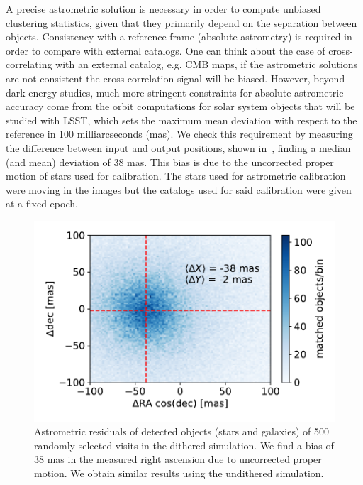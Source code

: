\documentclass[a4paper,fleqn,usenatbib]{mnras}
\begin{document}
A precise astrometric solution is necessary in order to compute unbiased clustering statistics, given that they primarily depend on the separation between objects. Consistency with a reference frame (absolute astrometry) is required in order to compare with external catalogs. One can think about the case of cross-correlating with an external catalog, e.g. CMB maps, if the astrometric solutions are not consistent the cross-correlation signal will be biased. However, beyond dark energy studies, much more stringent constraints for absolute astrometric accuracy come from the orbit computations for solar system objects that will be studied with LSST, which sets the maximum mean deviation with respect to the reference in 100 milliarcseconds (mas). We check this requirement by measuring the difference between input and output positions, shown in~, finding a median (and mean) deviation of 38 mas. This bias is due to the uncorrected proper motion of stars used for calibration. The stars used for astrometric calibration were moving in the images but the catalogs used for said calibration were given at a fixed epoch.

\begin{figure}
\centering
\includegraphics[width=0.9\columnwidth]{astrometric_residuals_single_visit_2d}
\caption{Astrometric residuals of detected objects (stars and galaxies) of 500 randomly selected visits in the dithered simulation. We find a bias of 38 mas in the measured right ascension due to uncorrected proper motion. We obtain similar results using the undithered simulation.}
\label{fig:AA1}
\end{figure}
\end{document}
